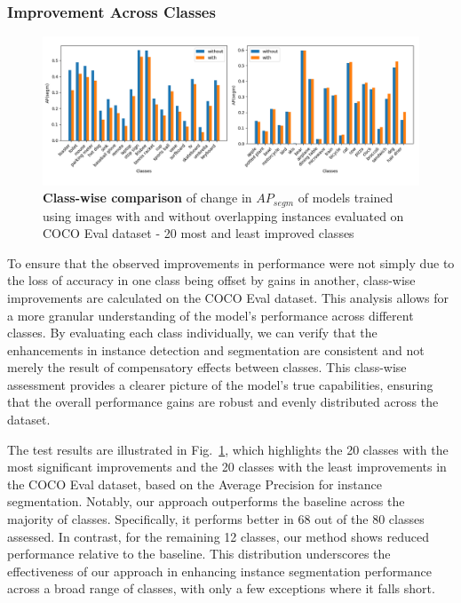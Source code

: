 \subsubsection{Improvement Across Classes}
\begin{figure}
	\centering
	\includegraphics[width=1.05\textwidth]{Images/main/overlap_classes.png}
	\caption[\textbf{Training without Overlapping Instances - Class-wise Comparison}]{\textbf{Class-wise comparison} of change in \(AP_{segm}\) of models trained using images with and without overlapping instances evaluated on COCO Eval dataset - 20 most and least improved classes}
	\label{fig:overlap_classes}
\end{figure}

To ensure that the observed improvements in performance were not simply due to the loss of accuracy in one class being offset by gains in another, class-wise improvements are calculated on the COCO Eval dataset. This analysis allows for a more granular understanding of the model’s performance across different classes. By evaluating each class individually, we can verify that the enhancements in instance detection and segmentation are consistent and not merely the result of compensatory effects between classes. This class-wise assessment provides a clearer picture of the model's true capabilities, ensuring that the overall performance gains are robust and evenly distributed across the dataset.

The test results are illustrated in Fig.~\ref{fig:overlap_classes}, which highlights the 20 classes with the most significant improvements and the 20 classes with the least improvements in the COCO Eval dataset, based on the Average Precision for instance segmentation. Notably, our approach outperforms the baseline across the majority of classes. Specifically, it performs better in 68 out of the 80 classes assessed. In contrast, for the remaining 12 classes, our method shows reduced performance relative to the baseline. This distribution underscores the effectiveness of our approach in enhancing instance segmentation performance across a broad range of classes, with only a few exceptions where it falls short.

